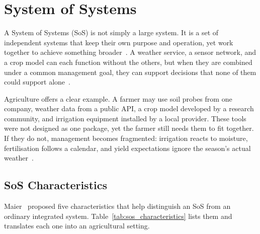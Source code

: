 \section{System of Systems}
\label{sec:sos}

A System of Systems (SoS) is not simply a large system. It is a set of
independent systems that keep their own purpose and operation, yet work together
to achieve something broader~\cite{maier1998architecting, jamshidi2008systems}.
A weather service, a sensor network, and a crop model can each function without
the others, but when they are combined under a common management goal, they can
support decisions that none of them could support alone~\cite{madni2014integration}.

Agriculture offers a clear example. A farmer may use soil probes from one
company, weather data from a public API, a crop model developed by a research
community, and irrigation equipment installed by a local provider. These tools
were not designed as one package, yet the farmer still needs them to fit
together. If they do not, management becomes fragmented: irrigation reacts to
moisture, fertilisation follows a calendar, and yield expectations ignore the
season's actual weather~\cite{nielsen2015sos, krisnawijaya2024architecture}.


\subsection{SoS Characteristics}

Maier~\cite{maier1998architecting} proposed five characteristics that help
distinguish an SoS from an ordinary integrated system. Table~\ref{tab:sos_characteristics}
lists them and translates each one into an agricultural setting.

